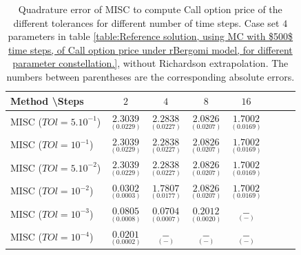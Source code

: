 \documentclass[11pt]{article}
\begin{document}
\begin{table}[h!]
	\centering
	\begin{tabular}{l*{6}{c}r}
		Method \textbackslash  Steps            & $2$ & $4$ & $8$ & $16$  \\
		\hline
		MISC ($TOl=5.10^{-1}$)  & $\underset{ (0.0229) }{\mathbf{  2.3039}}$ & $\underset{(0.0227)}{\mathbf{  2.2838}}$ & $\underset{(  0.0207)}{\mathbf{ 2.0826}}$ & $\underset{(   0.0169)}{\mathbf{ 1.7002}}$   \\
		MISC ($TOl=10^{-1}$)  & $\underset{ (0.0229) }{\mathbf{  2.3039}}$ & $\underset{( 0.0227)}{\mathbf{  2.2838}}$ & $\underset{(  0.0207)}{\mathbf{ 2.0826}}$ & $\underset{(   0.0169)}{\mathbf{ 1.7002}}$  \\
		MISC ($TOl=5.10^{-2}$)  &$\underset{ (0.0229) }{\mathbf{  2.3039}}$ & $\underset{( 0.0227)}{\mathbf{  2.2838}}$ & $\underset{(  0.0207)}{\mathbf{ 2.0826}}$ & $\underset{(   0.0169)}{\mathbf{ 1.7002}}$   \\
		MISC ($TOl=10^{-2}$)  & $\underset{(0.0003)}{\mathbf{
				0.0302}}$ & $\underset{( 0.0177)}{\mathbf{1.7807
		}}$ & $\underset{(  0.0207)}{\mathbf{ 2.0826}}$ & $\underset{(   0.0169)}{\mathbf{ 1.7002}}$  \\
		MISC ($TOl=10^{-3}$)  & $\underset{(0.0008)}{\mathbf{    0.0805}}$ & $\underset{( 0.0007)}{\mathbf{0.0704
		}}$ & $\underset{( 0.0020)}{\mathbf{ 0.2012
		}}$ & $\underset{( -)}{\mathbf{ -}}$  \\
		MISC ($TOl=10^{-4}$)  & $\underset{(0.0002)}{\mathbf{   0.0201}}$ & $\underset{( -)}{\mathbf{-
		}}$ & $\underset{(  -)}{\mathbf{ -}}$ & $\underset{( -)}{\mathbf{ -}}$  \\
		\hline
	\end{tabular}
	\caption{Quadrature error of MISC to compute Call option price of the different tolerances for different number of time steps. Case  set $4$ parameters in table \ref{table:Reference solution, using MC with $500$ time steps, of Call option price under rBergomi model, for different parameter constellation.}, without Richardson extrapolation. The numbers between parentheses are the corresponding absolute errors.}
	\label{Quadrature error of MISC to compute Call option price of the different tolerances for different number of time steps. Case  set $4$ parameters, without Richardson extrapolation. The numbers between parentheses are the corresponding absolute errors.}
\end{table}
\end{document}
